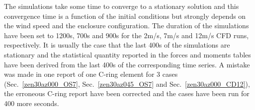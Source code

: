 The simulations take some time to converge to a stationary solution and this convergence time is a function of the initial conditions but strongly depends on the wind speed and the enclosure configuration.
The duration of the simulations have been set to 1200s, 700s and 900s for the 2m/s, 7m/s and 12m/s CFD runs, respectively.
It is usually the case that the last 400s of the simulations are stationary and
the statistical quantity reported in the forces and moments tables have been derived from
the last 400s of the corresponding time series.
A mistake was made in one report of one C-ring element for 3 cases (Sec.~\ref{zen30az000_OS7}, Sec.~\ref{zen30az045_OS7} and Sec.~\ref{zen30az000_CD12}), the erroneous C-ring report have been corrected and the cases have been run for 400 more seconds. 




